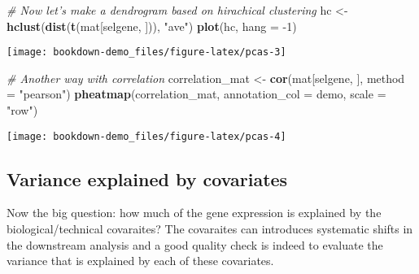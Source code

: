 \documentclass[]{book}
\newenvironment{Shaded}{\begin{snugshade}}{\end{snugshade}}
\newcommand{\CommentTok}[1]{\textcolor[rgb]{0.56,0.35,0.01}{\textit{#1}}}
\newcommand{\DataTypeTok}[1]{\textcolor[rgb]{0.13,0.29,0.53}{#1}}
\newcommand{\DecValTok}[1]{\textcolor[rgb]{0.00,0.00,0.81}{#1}}
\newcommand{\KeywordTok}[1]{\textcolor[rgb]{0.13,0.29,0.53}{\textbf{#1}}}
\newcommand{\NormalTok}[1]{#1}
\newcommand{\StringTok}[1]{\textcolor[rgb]{0.31,0.60,0.02}{#1}}
\begin{document}
\begin{Shaded}
\begin{Highlighting}[]

\CommentTok{# Now let's make a dendrogram based on hirachical clustering}
\NormalTok{hc <-}\StringTok{ }\KeywordTok{hclust}\NormalTok{(}\KeywordTok{dist}\NormalTok{(}\KeywordTok{t}\NormalTok{(mat[selgene, ])), }\StringTok{"ave"}\NormalTok{)}
\KeywordTok{plot}\NormalTok{(hc, }\DataTypeTok{hang =} \DecValTok{-1}\NormalTok{)}
\end{Highlighting}
\end{Shaded}

\begin{center}\texttt{[image: bookdown-demo\_files/figure-latex/pcas-3]} \end{center}

\begin{Shaded}
\begin{Highlighting}[]

\CommentTok{# Another way with correlation}
\NormalTok{correlation_mat <-}\StringTok{ }\KeywordTok{cor}\NormalTok{(mat[selgene, ], }\DataTypeTok{method =} \StringTok{"pearson"}\NormalTok{)}
\KeywordTok{pheatmap}\NormalTok{(correlation_mat, }\DataTypeTok{annotation_col =}\NormalTok{ demo, }\DataTypeTok{scale =} \StringTok{"row"}\NormalTok{)}
\end{Highlighting}
\end{Shaded}

\begin{center}\texttt{[image: bookdown-demo\_files/figure-latex/pcas-4]} \end{center}

\hypertarget{variance-explained-by-covariates}{%
\subsection{Variance explained by covariates}\label{variance-explained-by-covariates}}

Now the big question: how much of the gene expression is explained by the biological/technical covaraites?
The covaraites can introduces systematic shifts in the downstream analysis and a good quality check is indeed to evaluate the variance that is explained by each of these covariates.
\end{document}
